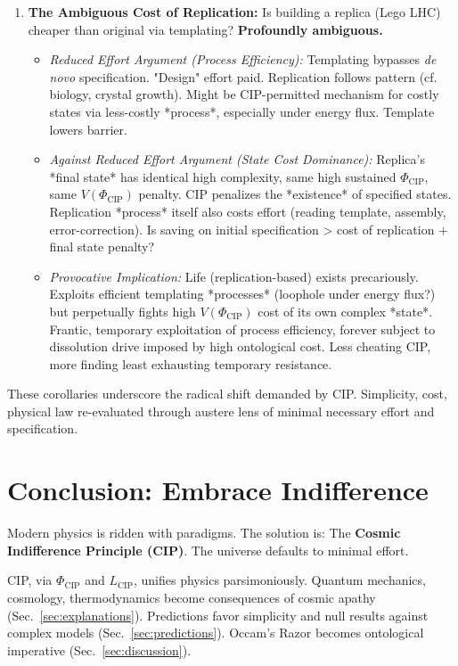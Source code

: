 \documentclass[11pt, a4paper]{article}
\newcommand{\subt}[1]{\mathrm{#1}}
\begin{document}
\begin{enumerate}
    \item \textbf{The Ambiguous Cost of Replication:} Is building a replica (Lego LHC) cheaper than original via templating? \textbf{Profoundly ambiguous.}
    \begin{itemize}
        \item \textit{Reduced Effort Argument (Process Efficiency):} Templating bypasses \textit{de novo} specification. "Design" effort paid. Replication follows pattern (cf. biology, crystal growth). Might be CIP-permitted mechanism for costly states via less-costly *process*, especially under energy flux. Template lowers barrier.
        \item \textit{Against Reduced Effort Argument (State Cost Dominance):} Replica's *final state* has identical high complexity, same high sustained $\Phi_{\subt{CIP}}$, same $V(\Phi_{\subt{CIP}})$ penalty. CIP penalizes the *existence* of specified states. Replication *process* itself also costs effort (reading template, assembly, error-correction). Is saving on initial specification > cost of replication + final state penalty?
        \item \textit{Provocative Implication:} Life (replication-based) exists precariously. Exploits efficient templating *processes* (loophole under energy flux?) but perpetually fights high $V(\Phi_{\subt{CIP}})$ cost of its own complex *state*. Frantic, temporary exploitation of process efficiency, forever subject to dissolution drive imposed by high ontological cost. Less cheating CIP, more finding least exhausting temporary resistance.
    \end{itemize}
\end{enumerate}

These corollaries underscore the radical shift demanded by CIP. Simplicity, cost, physical law re-evaluated through austere lens of minimal necessary effort and specification.



\section{Conclusion: Embrace Indifference} \label{sec:conclusion}

Modern physics is ridden with paradigms. The solution is: The \textbf{Cosmic Indifference Principle (CIP)}. The universe defaults to minimal effort.

CIP, via $\Phi_{\subt{CIP}}$ and $L_{\subt{CIP}}$, unifies physics parsimoniously. Quantum mechanics, cosmology, thermodynamics become consequences of cosmic apathy (Sec.~\ref{sec:explanations}). Predictions favor simplicity and null results against complex models (Sec.~\ref{sec:predictions}). Occam's Razor becomes ontological imperative (Sec.~\ref{sec:discussion}).
\end{document}
